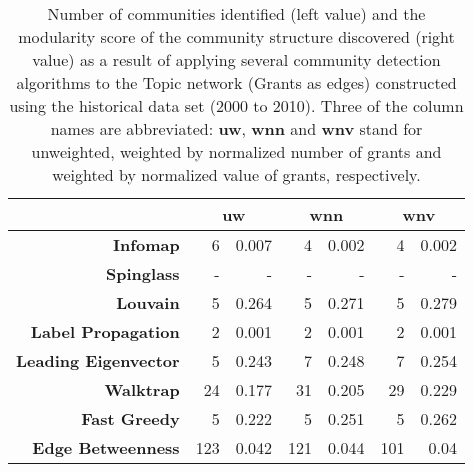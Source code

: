 \begin{table}[!htbp]
\centering
\caption[Number of communities and modularity score of community structure identified within the Topic network (Grants as edges) constructed using the historical data set (2000 to 2010)]{Number of communities identified (left value) and the modularity score of the community structure discovered (right value) as a result of applying several community detection algorithms to the Topic network (Grants as edges) constructed using the historical data set (2000 to 2010). Three of the column names are abbreviated: \textbf{uw}, \textbf{wnn} and \textbf{wnv} stand for unweighted, weighted by normalized number of grants and weighted by normalized value of grants, respectively.}
\label{table:topic_grants_2000_2010_modularity_appendix}
\begin{tabular}{r|rr|rr|rr}
\textbf{} & \multicolumn{2}{c|}{\textbf{uw}} & \multicolumn{2}{c|}{\textbf{wnn}} & \multicolumn{2}{c}{\textbf{wnv}}\\
\hline
\textbf{Infomap} & {6} & {0.007} & {4} & {0.002} & {4} & {0.002}\\
\textbf{Spinglass} & {-} & {-} & {-} & {-} & {-} & {-}\\
\textbf{Louvain} & {5} & {0.264} & {5} & {0.271} & {5} & {0.279}\\
\textbf{Label Propagation} & {2} & {0.001} & {2} & {0.001} & {2} & {0.001}\\
\textbf{Leading Eigenvector} & {5} & {0.243} & {7} & {0.248} & {7} & {0.254}\\
\textbf{Walktrap} & {24} & {0.177} & {31} & {0.205} & {29} & {0.229}\\
\textbf{Fast Greedy} & {5} & {0.222} & {5} & {0.251} & {5} & {0.262}\\
\textbf{Edge Betweenness} & {123} & {0.042} & {121} & {0.044} & {101} & {0.04}
\end{tabular}
\end{table}

